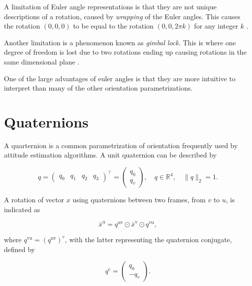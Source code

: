 A limitation of Euler angle representations is that they are not unique descriptions of a rotation, caused by \textit{wrapping} of the Euler angles. This causes  the rotation $ (0, 0, 0) $ to be equal to the rotation $ (0, 0, 2\pi k) $ for any integer $ k $ \cite{Kok2017}.\par 

Another limitation is a phenomenon known as \textit{gimbal lock}. This is where one degree of freedom is lost due to two rotations ending up causing rotations in the same dimensional plane \cite{Kok2017}.\par 

One of the large advantages of euler angles is that they are more intuitive to interpret than many of the other orientation parametrizations.


\section{Quaternions}
\label{sec:app_quaternion}
A quarternion is a common parametrization of orientation frequently used by attitude estimation algorithms. A unit quaternion can be described by

\begin{equation}
	\label{eq:app_unit_quarternion}
	q=\left(\begin{array}{llll}{q_{0}} & {q_{1}} & {q_{2}} & {q_{3}}\end{array}\right)^{\top}
	=\left(\begin{array}{l}{q_{0}} \\ {q_{v}}\end{array}\right), 
	\quad q \in \mathbb{R}^{4}, 
	\quad\|q\|_{2}=1.
\end{equation}

A rotation of vector $x$ using quaternions between two frames, from $v$ to $u$, is indicated as

\begin{equation}
	\label{eq:app_quat_rot}
	\bar{x}^{\mathrm{u}}=q^{\mathrm{uv}} \odot \bar{x}^{\mathrm{v}} \odot q^{\mathrm{vu}},
\end{equation}

where $q^{\mathrm{vu}} = \left(q^{\mathrm{uv}}\right)^{\mathrm{c}}$, with the latter representing the quaternion conjugate, defined by 

\begin{equation}
	\label{eq:app_quat_conjugate}
	q^{\mathrm{c}}=\left(\begin{array}{c}{q_{0}} \\ {-q_{v}}\end{array}\right).
\end{equation}


